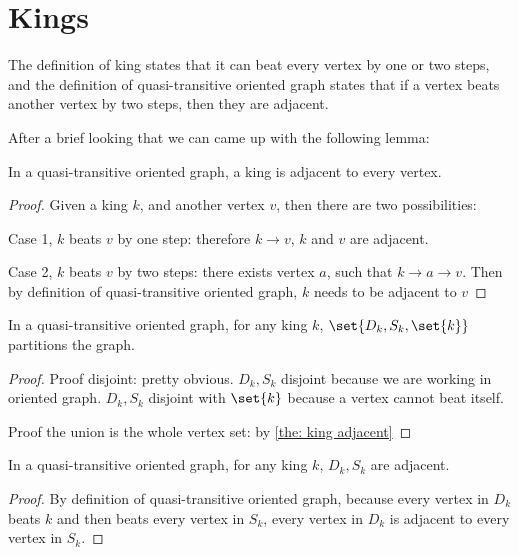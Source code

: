 \section{Kings}

The definition of king states that it can beat every vertex
by one or two steps,
and the definition of quasi-transitive oriented graph states that
if a vertex beats another vertex by two steps,
then they are adjacent.

After a brief looking that we can came up with the following
lemma:

\begin{lemma}\label{the: king adjacent}
  In a quasi-transitive oriented graph,
  a king is adjacent to every vertex.
\end{lemma}

\begin{proof}
  Given a king \(k\), and another vertex \(v\),
  then there are two possibilities:

  Case 1, \(k\) beats \(v\) by one step:
  therefore \(k \to v\), \(k\) and \(v\) are adjacent.

  Case 2, \(k\) beats \(v\) by two steps:
  there exists vertex \(a\), such that \(k \to a \to v\).
  Then by definition of quasi-transitive oriented graph,
  \(k\) needs to be adjacent to \(v\)
\end{proof}

\begin{lemma}
  In a quasi-transitive oriented graph,
  for any king \(k\), \(\set{D_k, S_k, \set{k}}\)
  partitions the graph.
\end{lemma}

\begin{proof}
  Proof disjoint: pretty obvious.
  \(D_k, S_k\) disjoint because we are working in oriented graph.
  \(D_k, S_k\) disjoint with \(\set{k}\)
  because a vertex cannot beat itself.

  Proof the union is the whole vertex set:
  by \cref{the: king adjacent}
\end{proof}

\begin{lemma}
  In a quasi-transitive oriented graph,
  for any king \(k\), \(D_k, S_k\) are adjacent.
\end{lemma}

\begin{proof}
  By definition of quasi-transitive oriented graph,
  because every vertex in \(D_k\) beats \(k\)
  and then beats every vertex in \(S_k\),
  every vertex in \(D_k\) is adjacent to every vertex in \(S_k\).
\end{proof}


